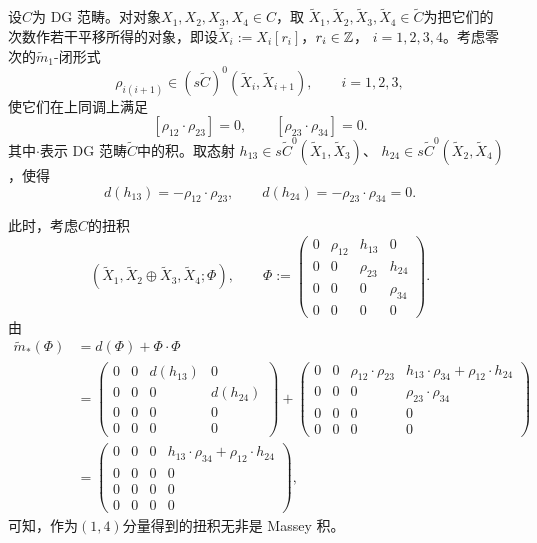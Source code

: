 \begin{example}
\label{ex:c04-5.2}
设$C$为 DG 范畴。对对象$X_{1},X_{2},X_{3},X_{4}\in C$，取
$\tilde{X}_{1},\tilde{X}_{2},\tilde{X}_{3},\tilde{X}_{4}\in\tilde{C}$为把它们的
次数作若干平移所得的对象，即设$\tilde{X}_{i}:=X_{i}[r_{i}]$，$r_{i}\in\mathbb{Z}$，
$i=1,2,3,4$。考虑零次的$\tilde{m}_{1}$-闭形式
\[
\rho_{i(i+1)}\in(s\tilde{C})^{0}(\tilde{X}_{i},\tilde{X}_{i+1}),
\qquad i=1,2,3,
\]
使它们在上同调上满足
\[
[\rho_{12}\cdot\rho_{23}]=0,\qquad [\rho_{23}\cdot\rho_{34}]=0.
\]
其中$\cdot$表示 DG 范畴$\tilde{C}$中的积。取态射
$h_{13}\in s\tilde{C}^{0}(\tilde{X}_{1},\tilde{X}_{3})$、
$h_{24}\in s\tilde{C}^{0}(\tilde{X}_{2},\tilde{X}_{4})$，使得
\[
d(h_{13})=-\rho_{12}\cdot\rho_{23},\qquad
d(h_{24})=-\rho_{23}\cdot\rho_{34}=0.
\]

此时，考虑$C$的扭积
\[
(\tilde{X}_{1},\tilde{X}_{2}\oplus\tilde{X}_{3},\tilde{X}_{4};\Phi),
\qquad
\Phi:=
\begin{pmatrix}
0 & \rho_{12} & h_{13} & 0\\
0 & 0 & \rho_{23} & h_{24}\\
0 & 0 & 0 & \rho_{34}\\
0 & 0 & 0 & 0
\end{pmatrix}.
\]
由
\[
\begin{aligned}
\tilde{m}_{*}(\Phi)&=d(\Phi)+\Phi\cdot\Phi\\
&=\begin{pmatrix}
0&0&d(h_{13})&0\\
0&0&0&d(h_{24})\\
0&0&0&0\\
0&0&0&0
\end{pmatrix}
+\begin{pmatrix}
0&0&\rho_{12}\cdot\rho_{23}&h_{13}\cdot\rho_{34}+\rho_{12}\cdot h_{24}\\
0&0&0&\rho_{23}\cdot\rho_{34}\\
0&0&0&0\\
0&0&0&0
\end{pmatrix}\\
&=\begin{pmatrix}
0&0&0&h_{13}\cdot\rho_{34}+\rho_{12}\cdot h_{24}\\
0&0&0&0\\
0&0&0&0\\
0&0&0&0
\end{pmatrix},
\end{aligned}
\]
可知，作为$(1,4)$分量得到的扭积无非是 Massey 积。
\end{example}

